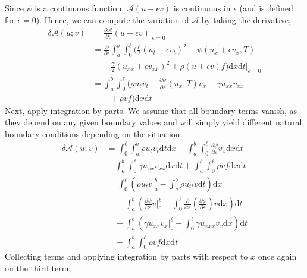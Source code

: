 \begin{multicols}{2}
\begin{equation}
\end{equation}
Since $\psi$ is a continuous function, $\mathcal{A}(u + \epsilon v)$ is continuous in $\epsilon$ (and is defined for $\epsilon = 0$). Hence, we can compute the variation of $\mathcal{A}$ by taking the derivative,
\begin{align*}
    \delta \mathcal{A}(u;v) &= \frac{\partial \mathcal{A}}{\partial \epsilon}(u + \epsilon v) \biggr\rvert_{\epsilon = 0} \\
    &= \frac{\partial}{\partial\epsilon} \int_a^b \int_0^{\ell} \bigg(\frac{\rho}{2}(u_t + \epsilon v_t)^2 - \psi(u_x + \epsilon v_x, T)\\
    & \quad - \frac{\gamma}{2}(u_{xx} + \epsilon v_{xx})^2 + \rho(u + \epsilon v)f \bigg) \mathrm{d}x \mathrm{d}t \biggr\rvert_{\epsilon = 0}\\
    &= \int_a^b \int_0^{\ell} \bigg(\rho u_t v_t - \frac{\partial\psi}{\partial\varepsilon}(u_x, T)v_x - \gamma u_{xx}v_{xx}\\
    & \qquad + \rho v f \bigg) \mathrm{d}x \mathrm{d}t
\end{align*}
Next, apply integration by parts. We assume that all boundary terms vanish, as they depend on any given boundary values and will simply yield different natural boundary conditions depending on the situation.
\begin{align*}
    \delta \mathcal{A}(u;v) &= \int_0^{\ell}\int_a^b \rho u_tv_t \mathrm{d}t\mathrm{d}x - \int_a^b\int_0^{\ell} \frac{\partial\psi}{\partial\varepsilon}v_x\mathrm{d}x \mathrm{d}t \\
    & \quad \int_a^b\int_0^{\ell}\gamma u_{xx}v_{xx}\mathrm{d}x\mathrm{d}t + \int_a^b\int_0^{\ell}\rho v f\mathrm{d}x\mathrm{d}t \\
    &= \int_0^{\ell} \left(\rho u_tv\biggr\rvert_a^b - \int_a^b \rho u_{tt}v\mathrm{d}t \right) \mathrm{d}x \\
    & \quad - \int_a^b \left(\frac{\partial\psi}{\partial\varepsilon}v\biggr\rvert_0^{\ell} - \int_0^{\ell} \frac{\partial}{\partial x} \left(\frac{\partial\psi}{\partial\varepsilon}\right) v\mathrm{d}x \right)\mathrm{d}t \\ 
    & \quad - \int_a^b \left(\gamma u_{xx}v_{x}\biggr\rvert_0^{\ell} - \int_0^{\ell}\gamma u_{xxx}v_x\mathrm{d}x \right)\mathrm{d}t \\
    & \quad + \int_a^b\int_0^{\ell}\rho v f\mathrm{d}x\mathrm{d}t
\end{align*}
Collecting terms and applying integration by parts with respect to $x$ once again on the third term,
\begin{align*}

\end{align*}
\end{multicols}
